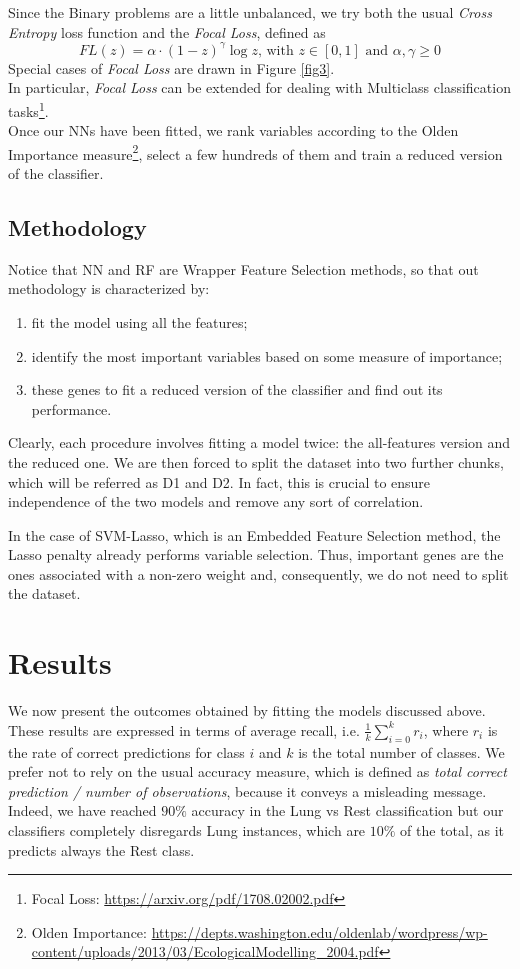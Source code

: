\documentclass[a4paper,11pt, oneside]{article}  %
\begin{document}
Since the Binary problems are a little unbalanced, we try both the usual \textit{Cross Entropy} loss function and the \textit{Focal Loss}, defined as 
\begin{equation*}
	FL(z) = \alpha \cdot (1 - z)^{\gamma} \log{z} \text{, with }z \in [0,1]  \text{ and } \alpha,  \gamma \geq 0
\end{equation*}
Special cases of \textit{Focal Loss} are drawn in Figure \ref{fig3}. \\
In particular, \textit{Focal Loss} can be extended for dealing with Multiclass classification tasks\footnote{Focal Loss: \url{https://arxiv.org/pdf/1708.02002.pdf}}. \\
Once our NNs have been fitted, we rank variables according to the Olden Importance measure\footnote{Olden Importance: \url{https://depts.washington.edu/oldenlab/wordpress/wp-content/uploads/2013/03/EcologicalModelling_2004.pdf}},  select a few hundreds of them and train a reduced version of the classifier. 

\subsection{Methodology}
Notice that NN and RF are Wrapper Feature Selection methods, so that out methodology is characterized by:
\begin{enumerate}
	\item fit the model using all the features;
	\item identify the most important variables based on some measure of importance; \item these genes to fit a reduced version of the classifier and find out its performance.
\end{enumerate} 
Clearly, each procedure involves fitting a model twice: the all-features version and the reduced one.  We are then forced to split the dataset into two further chunks, which will be referred as D1 and D2. In fact, this is crucial to ensure independence of the two models and remove any sort of correlation.

In the case of SVM-Lasso, which is an Embedded Feature Selection method, the Lasso penalty already performs variable selection. Thus, important genes are the ones associated with a non-zero weight and, consequently, we do not need to split the dataset. 

\section{Results}
We now present the outcomes obtained by fitting the models discussed above. These results are expressed in terms of average recall, i.e. $\frac{1}{k} \sum\limits_{i = 0 }^k r_i$, where $r_i$ is the rate of correct predictions for class $i$ and $k$ is the total number of classes. We prefer not to rely on the usual accuracy measure,  which is defined as \textit{total correct prediction / number of observations}, because it conveys a misleading message.  Indeed,  we have reached $90\%$ accuracy in the Lung vs Rest classification but our classifiers completely disregards Lung instances, which are $10\%$ of the total, as it predicts always the Rest class.  
\end{document}
